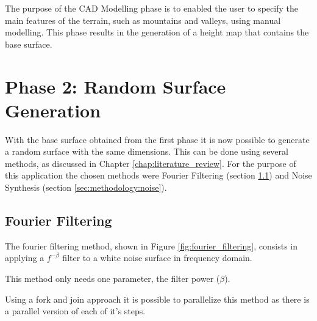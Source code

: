 The purpose of the CAD Modelling phase is to enabled the user to specify the main features of the terrain, such as mountains and valleys, using manual modelling. This phase results in the generation of a height map that contains the base surface.

\section{Phase 2: Random Surface Generation} \label{sec:methodology:phase2}

With the base surface obtained from the first phase it is now possible to generate a random surface with the same dimensions. This can be done using several methods, as discussed in Chapter \ref{chap:literature_review}. For the purpose of this application the chosen methods were Fourier Filtering (section \ref{sec:methodology:fourier}) and Noise Synthesis (section \ref{sec:methodology:noise}).


  \subsection{Fourier Filtering} \label{sec:methodology:fourier}
    
    The fourier filtering method, shown in Figure \ref{fig:fourier_filtering}, consists in applying a $f^{-\beta}$ filter to a white noise surface in frequency domain. 
    
    This method only needs one parameter, the filter power ($\beta$).
    
    Using a fork and join approach it is possible to parallelize this method as there is a parallel version of each of it's steps.
    
